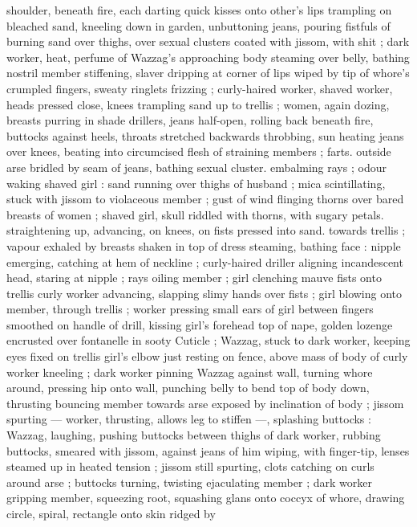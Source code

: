 shoulder, beneath fire, each darting quick kisses onto other's lips 
trampling on bleached sand, kneeling down in garden, unbuttoning 
jeans, pouring fistfuls of burning sand over thighs, over sexual 
clusters coated with jissom, with shit ; dark worker, heat, perfume of 
Wazzag's approaching body steaming over belly, bathing nostril 
member stiffening, slaver dripping at corner of lips wiped by tip of 
whore's crumpled fingers, sweaty ringlets frizzing ; curly-haired 
worker, shaved worker, heads pressed close, knees trampling sand 
up to trellis ; women, again dozing, breasts purring in shade 
drillers, jeans half-open, rolling back beneath fire, buttocks against 
heels, throats stretched backwards throbbing, sun heating jeans over 
knees, beating into circumcised flesh of straining members ; farts. 
outside arse bridled by seam of jeans, bathing sexual cluster. 
embalming rays ; odour waking shaved girl : sand running over 
thighs of husband ; mica scintillating, stuck with jissom to violaceous 
member ; gust of wind flinging thorns over bared breasts of women 
; shaved girl, skull riddled with thorns, with sugary petals. 
straightening up, advancing, on knees, on fists pressed into sand. 
towards trellis ; vapour exhaled by breasts shaken in top of dress 
steaming, bathing face : nipple emerging, catching at hem of 
neckline ; curly-haired driller aligning incandescent head, staring at 
nipple ; rays oiling member ; girl clenching mauve fists onto trellis 
curly worker advancing, slapping slimy hands over fists ; girl blowing 
onto member, through trellis ; worker pressing small ears of girl 
between fingers smoothed on handle of drill, kissing girl's forehead 
top of nape, golden lozenge encrusted over fontanelle in sooty 
Cuticle ; Wazzag, stuck to dark worker, keeping eyes fixed on trellis 
girl's elbow just resting on fence, above mass of body of curly 
worker kneeling ; dark worker pinning Wazzag against wall, turning 
whore around, pressing hip onto wall, punching belly to bend top of 
body down, thrusting bouncing member towards arse exposed by 
inclination of body ; jissom spurting --- worker, thrusting, allows leg 
to stiffen ---, splashing buttocks : Wazzag, laughing, pushing 
buttocks between thighs of dark worker, rubbing buttocks, smeared 
with jissom, against jeans of him wiping, with finger-tip, lenses 
steamed up in heated tension ; jissom still spurting, clots catching on 
curls around arse ; buttocks turning, twisting ejaculating member ; 
dark worker gripping member, squeezing root, squashing glans onto 
coccyx of whore, drawing circle, spiral, rectangle onto skin ridged by 
